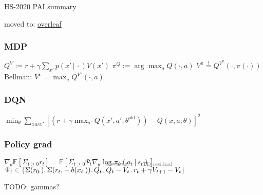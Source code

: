 \documentclass[11pt]{article}
\newcommand{\IE}{\mathbb{E}}
\newcommand{\given}{\,|\,}
\newcommand{\slot}{{\cdot}}
\begin{document}
\href{https://github.com/numpde/pai_summary}{HS-2020 PAI summary}
{\tiny\color{lightgray}\hfill{\DTMnow}}

{\color{red}\Large moved to: \href{https://www.overleaf.com/project/5ffaf4e7a589b27f928410f8}{overleaf}}

\subsubsection*{MDP} 

$
	Q^V := 
	r + \gamma \sum_{x'} p(x' \given \slot) V(x')
$
\quad
$
	\pi^Q := \arg\max_a Q(\slot, a)
$
\quad
$
	V^\pi \stackrel{!}{=} Q^{V^\pi}(\slot, \pi(\slot))
$
\quad
\hfill
Bellman:
$
	V^\star
	=
	\max_a
	Q^{V^\star}(\slot, a)
$

\subsubsection*{DQN}

$
	\min_\theta
	\sum_{xarx'}
	[
		(r + \gamma \max_{a'} Q(x', a'; \theta^\text{old}))
		-
		Q(x, a; \theta)
	]^2
$


\subsubsection*{Policy grad}

%
$
\nabla_\theta \IE[\Sigma_{t \geq 0} r_t] = 
\IE[\Sigma_{t \geq 0} \Psi_t \nabla_\theta \log \pi_\theta(a_t \given s_t)]
$
\hfill
$
	\color{gray}
	\Psi_t \in 
	\{
		{\color{black}
			\Sigma(r_{0:})
		},
		\hfill
		{\color{black}
			\Sigma(r_{t:} - b(x_{t:}))
		},
		\hfill
		{\color{black}
			Q_t
		},
		\hfill
		{\color{black}
			\smash{\stackrel{{
				\color{gray}
				\text{advantage}
			}}{Q_t - V_t}}
		},
		\hfill
		{\color{black}
			\smash{\stackrel{{
				\color{gray}
				\text{TD residual}
			}}{r_t + \gamma V_{t + 1} - V_t}}
		}
	\}
$

TODO: gammas?
%

\leavevmode\vfill
\end{document}
